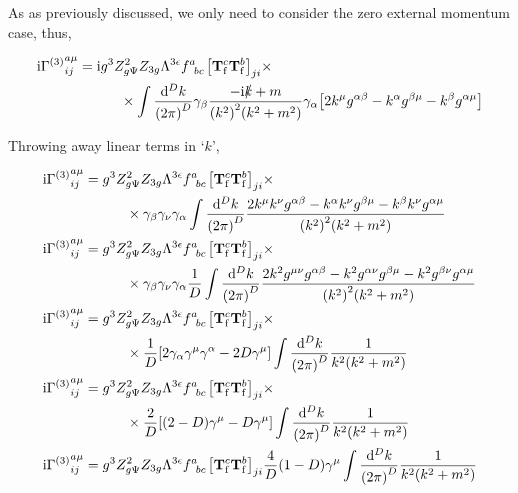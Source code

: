 As as previously discussed, we only need to consider the zero external momentum case, thus,

\begin{align}
    \im{\Gamma^{\qty(3)}}^{a\mu}_{ij}&=\im g^3Z_{g\Psi}^2Z_{3g}\Lambda^{3\epsilon}
    \tensor{f}{^a_b_c}\qty[\vb T^c_{\textnormal f}\vb T^b_{\textnormal f}]_{ji}\times\nonumber\\
    &\quad\quad\quad\times\int\frac{\dd[D]{k}}{\qty(2\pi)^D}\gamma_\beta
    \frac{-\im\slashed k+m}{\qty(k^2)^2\qty(k^2+m^2)}\gamma_\alpha\qty[2k^\mu g^{\alpha\beta}
    -k^\alpha g^{\beta\mu}-k^\beta g^{\alpha\mu}]\nonumber
\end{align}

Throwing away linear terms in `$k$',

\begin{align}
    \im{\Gamma^{\qty(3)}}^{a\mu}_{ij}&=g^3Z_{g\Psi}^2Z_{3g}\Lambda^{3\epsilon}
    \tensor{f}{^a_b_c}\qty[\vb T^c_{\textnormal f}\vb T^b_{\textnormal f}]_{ji}\times\nonumber\\
    &\quad\quad\quad\times\gamma_\beta\gamma_\nu\gamma_\alpha\int\frac{\dd[D]{k}}{\qty(2\pi)^D}
    \frac{2k^\mu k^\nu g^{\alpha\beta}
    -k^\alpha k^\nu g^{\beta\mu}-k^\beta k^\nu g^{\alpha\mu}}{\qty(k^2)^2\qty(k^2+m^2)}\nonumber\\
    \im{\Gamma^{\qty(3)}}^{a\mu}_{ij}&=g^3Z_{g\Psi}^2Z_{3g}\Lambda^{3\epsilon}
    \tensor{f}{^a_b_c}\qty[\vb T^c_{\textnormal f}\vb T^b_{\textnormal f}]_{ji}\times\nonumber\\
    &\quad\quad\quad\times\gamma_\beta\gamma_\nu\gamma_\alpha\frac1D\int\frac{\dd[D]{k}}{\qty(2\pi)^D}
    \frac{2k^2 g^{\mu\nu} g^{\alpha\beta}
    -k^2 g^{\alpha\nu} g^{\beta\mu}-k^2 g^{\beta\nu}g^{\alpha\mu}}{\qty(k^2)^2\qty(k^2+m^2)}\nonumber\\
    \im{\Gamma^{\qty(3)}}^{a\mu}_{ij}&=g^3Z_{g\Psi}^2Z_{3g}\Lambda^{3\epsilon}
    \tensor{f}{^a_b_c}\qty[\vb T^c_{\textnormal f}\vb T^b_{\textnormal f}]_{ji}\times\nonumber\\
    &\quad\quad\quad\times\frac1D\qty[2\gamma_\alpha\gamma^\mu\gamma^\alpha
    -2D\gamma^\mu]\int\frac{\dd[D]{k}}{\qty(2\pi)^D}
    \frac{1}{k^2\qty(k^2+m^2)}\nonumber\\
    \im{\Gamma^{\qty(3)}}^{a\mu}_{ij}&=g^3Z_{g\Psi}^2Z_{3g}\Lambda^{3\epsilon}
    \tensor{f}{^a_b_c}\qty[\vb T^c_{\textnormal f}\vb T^b_{\textnormal f}]_{ji}\times\nonumber\\
    &\quad\quad\quad\times\frac2D\qty[\qty(2-D)\gamma^\mu
    -D\gamma^\mu]\int\frac{\dd[D]{k}}{\qty(2\pi)^D}
    \frac{1}{k^2\qty(k^2+m^2)}\nonumber\\
    \im{\Gamma^{\qty(3)}}^{a\mu}_{ij}&=g^3Z_{g\Psi}^2Z_{3g}\Lambda^{3\epsilon}
    \tensor{f}{^a_b_c}\qty[\vb T^c_{\textnormal f}\vb T^b_{\textnormal f}]_{ji}\frac4D\qty(1-D)\gamma^\mu\int\frac{\dd[D]{k}}{\qty(2\pi)^D}
    \frac{1}{k^2\qty(k^2+m^2)}\nonumber
\end{align}

